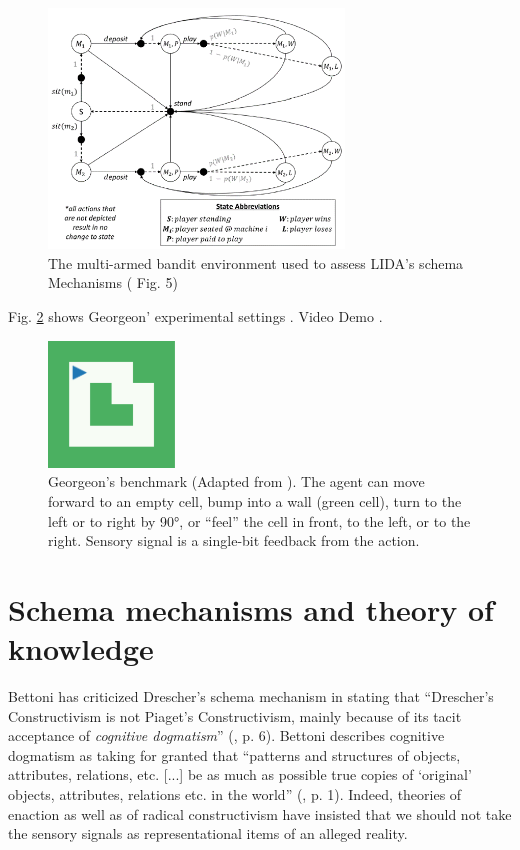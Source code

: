\documentclass[runningheads]{llncs}
\begin{document}
\begin{figure}
	\centering
	\includegraphics[width=0.7\textwidth]{Figure_LIDA_bench.png}
	\caption{The multi-armed bandit environment used to assess LIDA's schema Mechanisms (\cite{kugele_constructivist_nodate} Fig. 5)} 
	\label{fig:lida_bench}
\end{figure}



Fig. \ref{fig:georgeon} shows Georgeon' experimental settings \cite{georgeon_intrinsically-motivated_2012}.
Video Demo \cite{georgeon_video_2012}.


\begin{figure}
	\centering
	\includegraphics[width=0.3\textwidth]{Figure_grid_plot.pdf}
	\caption{Georgeon's benchmark (Adapted from \cite{georgeon_intrinsically-motivated_2012}).
	The agent can move forward to an empty cell, bump into a wall (green cell), turn to the left or to right by 90°, or ``feel'' the cell in front, to the left, or to the right. 
	Sensory signal is a single-bit feedback from the action. 	
} 
	\label{fig:georgeon}
\end{figure}


\section{Schema mechanisms and theory of knowledge}

Bettoni  has criticized Drescher's schema mechanism in stating that ``Drescher's Constructivism is not Piaget's Constructivism, mainly because of its tacit acceptance of \textit{cognitive dogmatism}'' (\cite{bettoni_made-up_1993}, p. 6).
Bettoni describes cognitive dogmatism as taking for granted that ``patterns and structures of objects, attributes, relations, etc. [...] be as much as possible true copies of `original' objects, attributes, relations etc. in the world'' (\cite{bettoni_made-up_1993}, p. 1).
Indeed, theories of enaction as well as of radical constructivism have insisted that we should not take the sensory signals as representational items of an alleged reality. 
\end{document}
